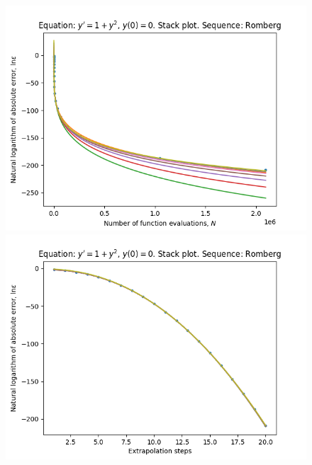 \begin{figure}[H]
\centering
\begin{minipage}{0.45\textwidth}
\centering
\includegraphics[scale=0.45]{../results/emr_plots/tangens_hp_romberg_stack.png}
\end{minipage}
\begin{minipage}{0.45\textwidth}
\centering
\includegraphics[scale=0.45]{../results/emr_plots/tangens_hp_romberg_steps_stack.png}
\end{minipage}
\end{figure}

